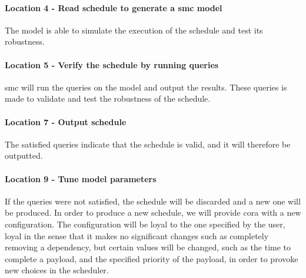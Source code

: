 \paragraph{Location 4 - Read schedule to generate a \gls{smc} model}
The model is able to simulate the execution of the schedule and test its robustness.

\paragraph{Location 5 - Verify the schedule by running queries} 
\gls{smc} will run the queries on the model and output the results.
These queries is made to validate and test the robustness of the schedule.

\paragraph{Location 7 - Output schedule} 
The satisfied queries indicate that the schedule is valid, and it will therefore be outputted.

\paragraph{Location 9 - Tune model parameters} 
If the queries were not satisfied, the schedule will be discarded and a new one will be produced.
In order to produce a new schedule, we will provide \gls{cora} with a new configuration.
The configuration will be loyal to the one specified by the user, loyal in the sense that it makes no significant changes such as completely removing a dependency, but certain values will be changed, such as the time to complete a payload, and the specified priority of the payload, in order to provoke new choices in the scheduler.
